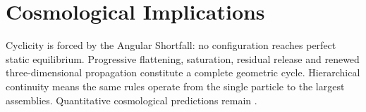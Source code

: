 \section{Cosmological Implications}
\label{sec:cosmology}

Cyclicity is forced by the Angular Shortfall: no configuration reaches perfect
static equilibrium. Progressive flattening, saturation, residual release and
renewed three-dimensional propagation constitute a complete geometric cycle.
Hierarchical continuity means the same rules operate from the single particle to
the largest assemblies. Quantitative cosmological predictions remain \openq.
